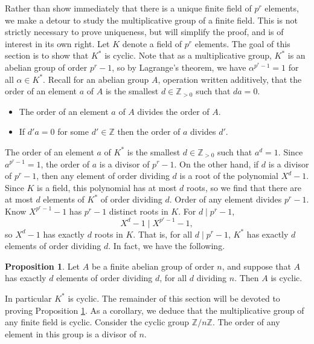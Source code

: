 \documentclass{article}
\newcommand{\Z}{\mathbb{Z}}
\theoremstyle{definition}\newtheorem{definition}{Definition}[subsection]
\theoremstyle{definition}\newtheorem{remark}[definition]{Remark}
\theoremstyle{definition}\newtheorem*{example}{Example}
\theoremstyle{definition}\newtheorem*{note}{Note}
\newtheorem{proposition}[definition]{Proposition}
\begin{document}
Rather than show immediately that there is a unique finite field of $ p^r $ elements, we make a detour to study the multiplicative group of a finite field. This is not strictly necessary to prove uniqueness, but will simplify the proof, and is of interest in its own right. Let $ K $ denote a field of $ p^r $ elements. The goal of this section is to show that $ K^* $ is cyclic. Note that as a multiplicative group, $ K^* $ is an abelian group of order $ p^r - 1 $, so by Lagrange's theorem, we have $ \alpha^{p^r - 1} = 1 $ for all $ \alpha \in K^* $. Recall for an abelian group $ A $, operation written additively, that the order of an element $ a $ of $ A $ is the smallest $ d \in \Z_{> 0} $ such that $ da = 0 $.
\begin{itemize}
\item The order of an element $ a $ of $ A $ divides the order of $ A $.
\item If $ d'a = 0 $ for some $ d' \in \Z $ then the order of $ a $ divides $ d' $.
\end{itemize}
The order of an element $ a $ of $ K^* $ is the smallest $ d \in \Z_{> 0} $ such that $ a^d = 1 $. Since $ a^{p^r - 1} = 1 $, the order of $ a $ is a divisor of $ p^r - 1 $. On the other hand, if $ d $ is a divisor of $ p^r - 1 $, then any element of order dividing $ d $ is a root of the polynomial $ X^d - 1 $. Since $ K $ is a field, this polynomial has at most $ d $ roots, so we find that there are at most $ d $ elements of $ K^* $ of order dividing $ d $. Order of any element divides $ p^r - 1 $. Know $ X^{p^r - 1} - 1 $ has $ p^r - 1 $ distinct roots in $ K $. For $ d \mid p^r - 1 $,
$$ X^d - 1 \mid X^{p^r - 1} - 1, $$
so $ X^d - 1 $ has exactly $ d $ roots in $ K $. That is, for all $ d \mid p^r - 1 $, $ K^* $ has exactly $ d $ elements of order dividing $ d $. In fact, we have the following.

\begin{proposition}
\label{prop:6.4.1}
Let $ A $ be a finite abelian group of order $ n $, and suppose that $ A $ has exactly $ d $ elements of order dividing $ d $, for all $ d $ dividing $ n $. Then $ A $ is cyclic.
\end{proposition}

In particular $ K^* $ is cyclic. The remainder of this section will be devoted to proving Proposition \ref{prop:6.4.1}. As a corollary, we deduce that the multiplicative group of any finite field is cyclic. Consider the cyclic group $ \Z / n\Z $. The order of any element in this group is a divisor of $ n $.
\end{document}
